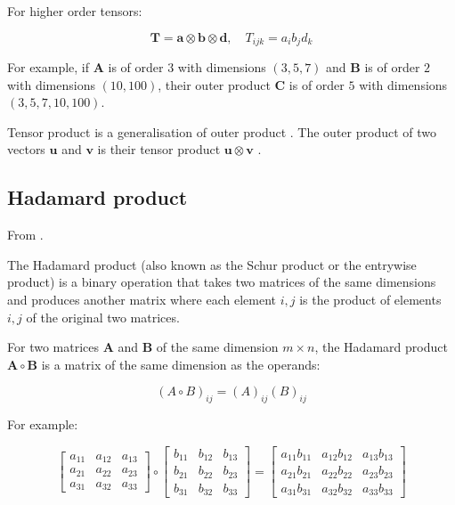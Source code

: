 \documentclass{article}
\begin{document}
For higher order tensors:

\begin{equation}
    \mathbf{T} = \mathbf{a} \otimes \mathbf{b} \otimes \mathbf{d}, \quad T_{i j k}=a_{i} b_{j} d_{k}
\end{equation}

For example, if $\mathbf{A}$ is of order $3$ with dimensions $(3, 5, 7)$ and $\mathbf{B}$ is of order $2$ with dimensions $(10, 100)$, their outer product $\mathbf{C}$ is of order $5$ with dimensions $(3, 5, 7, 10, 100)$.

Tensor product is a generalisation of outer product \cite{wiki2019tensorProd}. The outer product of two vectors $\mathbf{u}$ and $\mathbf{v}$ is their tensor product $\mathbf{u} \otimes \mathbf{v}$ \cite{wiki2019outerProd}.


\subsection{Hadamard product}
\label{subsec: Hadamard product}

From \cite{wiki2019hadamardProd}.

The Hadamard product (also known as the Schur product or the entrywise product) is a binary operation that takes two matrices of the same dimensions and produces another matrix where each element $i, j$ is the product of elements $i, j$ of the original two matrices. 

For two matrices $\mathbf{A}$ and $\mathbf{B}$ of the same dimension $m \times n$, the Hadamard product $\mathbf{A} \circ \mathbf{B}$ is a matrix of the same dimension as the operands:

\begin{equation}
    (A \circ B)_{i j}=(A)_{i j}(B)_{i j}
\end{equation}

For example:

\begin{equation}
    \left[ \begin{array}{ccc}{a_{11}} & {a_{12}} & {a_{13}} \\ {a_{21}} & {a_{22}} & {a_{23}} \\ {a_{31}} & {a_{32}} & {a_{33}}\end{array}\right] \circ \left[ \begin{array}{ccc}{b_{11}} & {b_{12}} & {b_{13}} \\ {b_{21}} & {b_{22}} & {b_{23}} \\ {b_{31}} & {b_{32}} & {b_{33}}\end{array}\right]=\left[ \begin{array}{ccc}{a_{11} b_{11}} & {a_{12} b_{12}} & {a_{13} b_{13}} \\ {a_{21} b_{21}} & {a_{22} b_{22}} & {a_{23} b_{23}} \\ {a_{31} b_{31}} & {a_{32} b_{32}} & {a_{33} b_{33}}\end{array}\right]
\end{equation}
\end{document}
